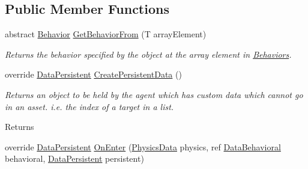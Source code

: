 \subsection*{Public Member Functions}
\begin{DoxyCompactItemize}
\item 
abstract \hyperlink{class_skyrates_1_1_a_i_1_1_behavior}{Behavior} \hyperlink{class_skyrates_1_1_a_i_1_1_composite_1_1_behavior_pipeline_3_01_t_01_4_ab6aaf60a0fbbc573158cfaecf7264040}{Get\-Behavior\-From} (T array\-Element)
\begin{DoxyCompactList}\small\item\em Returns the behavior specified by the object at the array element in \hyperlink{class_skyrates_1_1_a_i_1_1_composite_1_1_behavior_pipeline_3_01_t_01_4_a2aab9838c797aba8c79d66325e6e2874}{Behaviors}. \end{DoxyCompactList}\item 
\hypertarget{class_skyrates_1_1_a_i_1_1_composite_1_1_behavior_pipeline_3_01_t_01_4_affbd80f17a660e35996f9948b7e19c5e}{override \hyperlink{class_skyrates_1_1_a_i_1_1_behavior_1_1_data_persistent}{Data\-Persistent} \hyperlink{class_skyrates_1_1_a_i_1_1_composite_1_1_behavior_pipeline_3_01_t_01_4_affbd80f17a660e35996f9948b7e19c5e}{Create\-Persistent\-Data} ()}\label{class_skyrates_1_1_a_i_1_1_composite_1_1_behavior_pipeline_3_01_t_01_4_affbd80f17a660e35996f9948b7e19c5e}

\begin{DoxyCompactList}\small\item\em Returns an object to be held by the agent which has custom data which cannot go in an asset. i.\-e. the index of a target in a list. 

\begin{DoxyReturn}{Returns}

\end{DoxyReturn}
 \end{DoxyCompactList}\item 
\hypertarget{class_skyrates_1_1_a_i_1_1_composite_1_1_behavior_pipeline_3_01_t_01_4_ac48d512a6db18a2b7ac8e8af15fc9a52}{override \hyperlink{class_skyrates_1_1_a_i_1_1_behavior_1_1_data_persistent}{Data\-Persistent} \hyperlink{class_skyrates_1_1_a_i_1_1_composite_1_1_behavior_pipeline_3_01_t_01_4_ac48d512a6db18a2b7ac8e8af15fc9a52}{On\-Enter} (\hyperlink{class_skyrates_1_1_physics_1_1_physics_data}{Physics\-Data} physics, ref \hyperlink{class_skyrates_1_1_a_i_1_1_behavior_1_1_data_behavioral}{Data\-Behavioral} behavioral, \hyperlink{class_skyrates_1_1_a_i_1_1_behavior_1_1_data_persistent}{Data\-Persistent} persistent)}\label{class_skyrates_1_1_a_i_1_1_composite_1_1_behavior_pipeline_3_01_t_01_4_ac48d512a6db18a2b7ac8e8af15fc9a52}


\end{DoxyCompactItemize}
